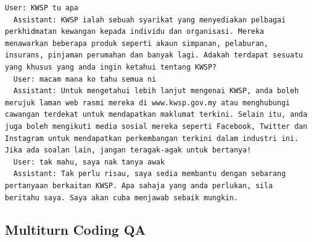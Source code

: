 \documentclass[preprint]{article}
\begin{document}
\begin{lstlisting}[breaklines=true]
  User: KWSP tu apa
  Assistant: KWSP ialah sebuah syarikat yang menyediakan pelbagai perkhidmatan kewangan kepada individu dan organisasi. Mereka menawarkan beberapa produk seperti akaun simpanan, pelaburan, insurans, pinjaman perumahan dan banyak lagi. Adakah terdapat sesuatu yang khusus yang anda ingin ketahui tentang KWSP?
  User: macam mana ko tahu semua ni
  Assistant: Untuk mengetahui lebih lanjut mengenai KWSP, anda boleh merujuk laman web rasmi mereka di www.kwsp.gov.my atau menghubungi cawangan terdekat untuk mendapatkan maklumat terkini. Selain itu, anda juga boleh mengikuti media sosial mereka seperti Facebook, Twitter dan Instagram untuk mendapatkan perkembangan terkini dalam industri ini. Jika ada soalan lain, jangan teragak-agak untuk bertanya!
  User: tak mahu, saya nak tanya awak
  Assistant: Tak perlu risau, saya sedia membantu dengan sebarang pertanyaan berkaitan KWSP. Apa sahaja yang anda perlukan, sila beritahu saya. Saya akan cuba menjawab sebaik mungkin.
\end{lstlisting}

\subsection{Multiturn Coding QA}
\end{document}
